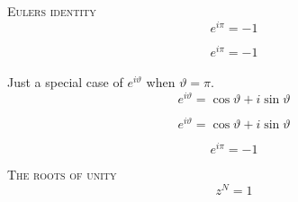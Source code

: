 \documentclass[14pt]{beamer}
\begin{document}
\begin{frame}
    \centering
    \textsc{Eulers identity}\\[1em]

    \begin{equation}
        e^{i \pi} = -1
    \end{equation}
\end{frame}

\begin{frame}
    \begin{equation*}
        e^{i \pi} = -1
    \end{equation*}\\[1em]

    \centering
    Just a special case of $e^{i \vartheta}$ when $\vartheta = \pi$.
    \begin{equation}
        e^{i\vartheta} = \cos{\vartheta} + i \sin{\vartheta}
    \end{equation}
\end{frame}


\begin{frame}
    \begin{equation*}
        e^{i\vartheta} = \cos{\vartheta} + i \sin{\vartheta}
    \end{equation*}
    \begin{figure}
        \centering
        
    \end{figure}
\end{frame}

\begin{frame}
    \begin{equation*}
        e^{i\pi} = -1
    \end{equation*}
    \begin{figure}
        \centering
        
    \end{figure}
\end{frame}


\begin{frame}
    \centering
    \textsc{The roots of unity}\\[1em]
    \begin{equation*}
        z^N = 1
    \end{equation*}
\end{frame}
\end{document}
